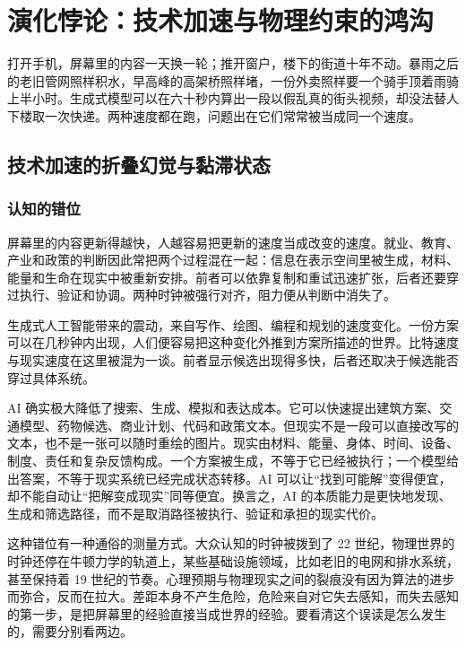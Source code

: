 \chapter{演化悖论：技术加速与物理约束的鸿沟}

打开手机，屏幕里的内容一天换一轮；推开窗户，楼下的街道十年不动。暴雨之后的老旧管网照样积水，早高峰的高架桥照样堵，一份外卖照样要一个骑手顶着雨骑上半小时。生成式模型可以在六十秒内算出一段以假乱真的街头视频，却没法替人下楼取一次快递。两种速度都在跑，问题出在它们常常被当成同一个速度。

\section{技术加速的折叠幻觉与黏滞状态}

\subsection{认知的错位}

屏幕里的内容更新得越快，人越容易把更新的速度当成改变的速度。就业、教育、产业和政策的判断因此常把两个过程混在一起：信息在表示空间里被生成，材料、能量和生命在现实中被重新安排。前者可以依靠复制和重试迅速扩张，后者还要穿过执行、验证和协调。两种时钟被强行对齐，阻力便从判断中消失了。


生成式人工智能带来的震动，来自写作、绘图、编程和规划的速度变化。一份方案可以在几秒钟内出现，人们便容易把这种变化外推到方案所描述的世界。比特速度与现实速度在这里被混为一谈。前者显示候选出现得多快，后者还取决于候选能否穿过具体系统。

AI 确实极大降低了搜索、生成、模拟和表达成本。它可以快速提出建筑方案、交通模型、药物候选、商业计划、代码和政策文本。但现实不是一段可以直接改写的文本，也不是一张可以随时重绘的图片。现实由材料、能量、身体、时间、设备、制度、责任和复杂反馈构成。一个方案被生成，不等于它已经被执行；一个模型给出答案，不等于现实系统已经完成状态转移。AI 可以让“找到可能解”变得便宜，却不能自动让“把解变成现实”同等便宜。换言之，AI 的本质能力是更快地发现、生成和筛选路径，而不是取消路径被执行、验证和承担的现实代价。

这种错位有一种通俗的测量方式。大众认知的时钟被拨到了 22 世纪，物理世界的时钟还停在牛顿力学的轨道上，某些基础设施领域，比如老旧的电网和排水系统，甚至保持着 19 世纪的节奏。心理预期与物理现实之间的裂痕没有因为算法的进步而弥合，反而在拉大。差距本身不产生危险，危险来自对它失去感知，而失去感知的第一步，是把屏幕里的经验直接当成世界的经验。要看清这个误读是怎么发生的，需要分别看两边。

